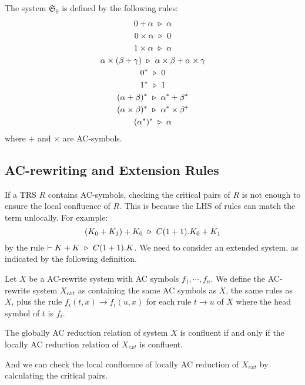 \begin{definition}
  The system $\mathfrak{S}_0$ is defined by the following rules:
  \begin{gather*}
    0 + \alpha \ \triangleright\  \alpha\\
    0 \times \alpha \ \triangleright\  0\\
    1 \times \alpha \ \triangleright\  \alpha\\
    \alpha \times (\beta + \gamma) \ \triangleright\  \alpha \times \beta + \alpha \times \gamma\\
    0^* \ \triangleright\  0 \\
    1^* \ \triangleright\  1 \\
    (\alpha + \beta)^* \ \triangleright\  \alpha^* + \beta^*\\
    (\alpha \times \beta)^* \ \triangleright\  \alpha^* \times \beta^*\\
    (\alpha^*)^* \ \triangleright\  \alpha
  \end{gather*}
  where $+$ and $\times$ are AC-symbols.
\end{definition}


\subsection{AC-rewriting and Extension Rules}
If a TRS $R$ contains AC-symbols, checking the critical pairs of $R$ is not enough to ensure the local confluence of $R$. This is because the LHS of rules can match the term unlocally. For example:
$$
(K_0 + K_1) + K_0 \ \triangleright\  C(1 + 1).K_0 + K_1
$$
by the rule $\vdash K + K \ \triangleright\  C(1 + 1).K$. We need to consider an extended system, as indicated by the following definition.

\begin{definition}
  Let $X$ be a AC-rewrite system with AC symbols $f_1, \cdots, f_n$. We define the AC-rewrite system $X_{ext}$ as containing the same AC symbols as $X$, the same rules as $X$, plus the rule $f_i(t, x) \to f_i(u, x)$ for each rule $t \to u$ of $X$ where the head symbol of $t$ is $f_i$.
\end{definition}

\begin{proposition}
  The globally AC reduction relation of system $X$ is confluent if and only if the locally AC reduction relation of $X_{ext}$ is confluent.
\end{proposition}

And we can check the local confluence of locally AC reduction of $X_{ext}$ by calculating the critical pairs.

